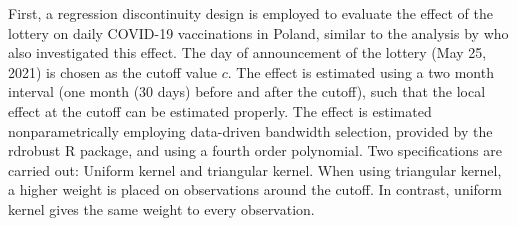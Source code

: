 \documentclass{scrbook}
\begin{document}
First, a regression discontinuity design is employed to evaluate the
effect of the lottery on daily COVID-19 vaccinations in Poland, similar
to the analysis by \textcite{kuznetsova_effectiveness_2022} who also
investigated this effect. The day of announcement of the lottery (May
25, 2021) is chosen as the cutoff value \(c\). The effect is estimated
using a two month interval (one month (30 days) before and after the
cutoff), such that the local effect at the cutoff can be estimated
properly. The effect is estimated nonparametrically employing
data-driven bandwidth selection, provided by the rdrobust R package, and
using a fourth order polynomial. Two specifications are carried out:
Uniform kernel and triangular kernel. When using triangular kernel, a
higher weight is placed on observations around the cutoff. In contrast,
uniform kernel gives the same weight to every observation.
\end{document}
